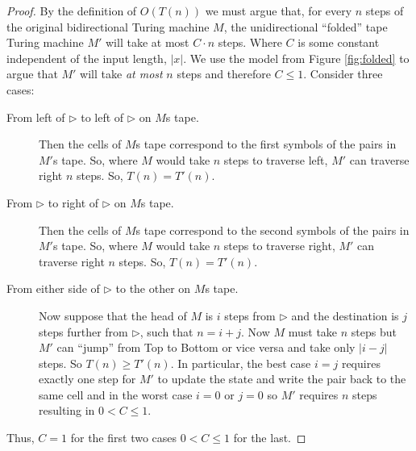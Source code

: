 \documentclass[usletter]{article}
\begin{document}
\begin{proof}
  By the definition of $O(T(n))$ we must argue that, for every $n$ steps of the original bidirectional Turing machine $M$, the unidirectional ``folded'' tape Turing machine $M'$ will take at most $C \cdot n$ steps. Where $C$ is some constant independent of the input length, $|x|$. We use the model from Figure \ref{fig:folded} to argue that $M'$ will take \textit{at most} $n$ steps and therefore $C \le 1$. Consider three cases:

  \begin{description}
    \item[From left of $\rhd$ to left of $\rhd$ on $M$s tape.] Then the cells of $M$s tape correspond to the first symbols of the pairs in $M'$s tape. So, where $M$ would take $n$ steps to traverse left, $M'$ can traverse right $n$ steps. So, $T(n) = T'(n)$.

    \item[From $\rhd$ to right of $\rhd$ on $M$s tape.] Then the cells of $M$s tape correspond to the second symbols of the pairs in $M'$s tape. So, where $M$ would take $n$ steps to traverse right, $M'$ can traverse right $n$ steps. So, $T(n) = T'(n)$.

    \item[From either side of $\rhd$ to the other on $M$s tape.] Now suppose that the head of $M$ is $i$ steps from $\rhd$ and the destination is $j$ steps further from $\rhd$, such that $n = i + j$. Now $M$ must take $n$ steps but $M'$ can ``jump'' from Top to Bottom or vice versa and take only $|i - j|$ steps. So $T(n) \ge T'(n)$. In particular, the best case $i = j$ requires exactly one step for $M'$ to update the state and write the pair back to the same cell and in the worst case $i = 0$  or $j = 0$ so $M'$ requires $n$ steps resulting in $0 < C \le 1$.
  \end{description}

Thus, $C = 1$ for the first two cases $0 < C \le 1$ for the last.
\end{proof}


\newpage



\end{document}
